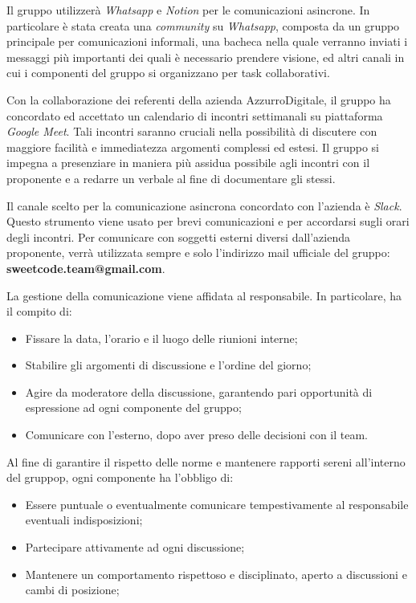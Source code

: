 \documentclass[10pt, a4paper]{article}
\begin{document}
Il gruppo utilizzerà \textit{Whatsapp} e \textit{Notion} per le comunicazioni asincrone. In particolare è stata creata una \textit{community} su \textit{Whatsapp}, composta da un gruppo principale per comunicazioni informali, una bacheca nella quale verranno inviati i messaggi più importanti dei quali è necessario prendere visione, ed altri canali in cui i componenti del gruppo si organizzano per task collaborativi.


Con la collaborazione dei referenti della azienda AzzurroDigitale, il gruppo ha concordato ed accettato un calendario di incontri settimanali su piattaforma \textit{Google Meet}. Tali incontri saranno cruciali nella possibilità di discutere con maggiore facilità e immediatezza argomenti complessi ed estesi. Il gruppo si impegna a presenziare in maniera più assidua possibile agli incontri con il proponente e a redarre un verbale al fine di documentare gli stessi.

Il canale scelto per la comunicazione asincrona concordato con l'azienda è \textit{Slack}. Questo strumento viene usato per brevi comunicazioni e per accordarsi sugli orari degli incontri.
Per comunicare con soggetti esterni diversi dall'azienda proponente, verrà utilizzata sempre e solo l'indirizzo mail ufficiale del gruppo: \textbf{sweetcode.team@gmail.com}.

La gestione della comunicazione viene affidata al responsabile. In particolare, ha il compito di:
\begin{itemize}
    \item Fissare la data, l'orario e il luogo delle riunioni interne;
    \item Stabilire gli argomenti di discussione e l'ordine del giorno;
    \item Agire da moderatore della discussione, garantendo pari opportunità di espressione ad ogni componente del gruppo;
    \item Comunicare con l'esterno, dopo aver preso delle decisioni con il team. 
\end{itemize}

Al fine di garantire il rispetto delle norme e mantenere rapporti sereni all'interno del gruppop, ogni componente ha l'obbligo di:
\begin{itemize}
    \item Essere puntuale o eventualmente comunicare tempestivamente al responsabile eventuali indisposizioni;
    \item Partecipare attivamente ad ogni discussione;
    \item Mantenere un comportamento rispettoso e disciplinato, aperto a discussioni e cambi di posizione;
\end{itemize}
\end{document}

